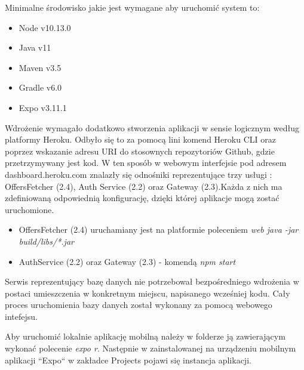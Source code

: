 \newpage
Minimalne środowisko jakie jest wymagane aby uruchomić system to:
\begin{itemize}
	\item Node v10.13.0
	\item Java v11
	\item Maven v3.5
	\item Gradle v6.0
	\item Expo v3.11.1
\end{itemize}

Wdrożenie wymagało dodatkowo stworzenia aplikacji w sensie logicznym według platformy Heroku. Odbyło się to za pomocą lini komend Heroku CLI oraz poprzez wskazanie adresu URI do stosownych repozytoriów Github, gdzie przetrzymywany jest kod.
W ten sposób w webowym interfejsie pod adresem dashboard.heroku.com znalazły się odnośniki reprezentujące trzy usługi : OffersFetcher (2.4), Auth Service (2.2) oraz Gateway (2.3).\newline Każda z nich ma zdefiniowaną odpowiednią konfigurację, dzięki której aplikacje mogą zostać uruchomione.
\begin{itemize}
	\item {OffersFetcher (2.4) uruchamiany jest na platformie poleceniem \textit{web java -jar build/libs/*.jar}}
	\item {AuthService (2.2) oraz Gateway (2.3) - komendą \textit{npm start}}
\end{itemize}

Serwis reprezentujący bazę danych nie potrzebował bezpośredniego wdrożenia w postaci umieszczenia w konkretnym miejscu, napisanego wcześniej kodu. Cały proces uruchomienia bazy danych został wykonany za pomocą webowego intefejsu.

Aby uruchomić lokalnie aplikację mobilną należy w folderze ją zawierającym wykonać polecenie \textit{expo r}. Następnie w zainstalowanej na urządzeniu mobilnym aplikacji ``Expo`` w zakładce Projects pojawi się instancja aplikacji.

